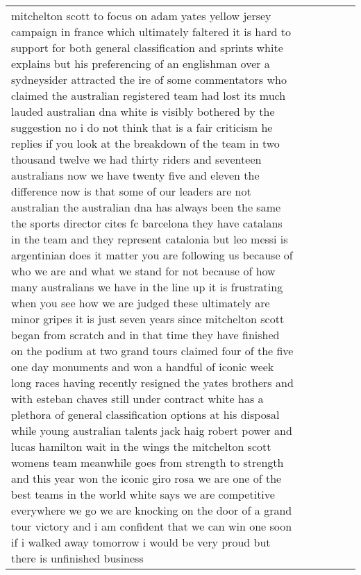 \documentclass[]{article}
\begin{document}
\begin{table}[!h]
\begin{tabular}[t]{llllll}
mitchelton scott to focus on adam yates yellow jersey campaign in france which ultimately faltered it is hard to support for both general classification and sprints white explains but his preferencing of an englishman over a sydneysider attracted the ire of some commentators who claimed the australian registered team had lost its much lauded australian dna white is visibly bothered by the suggestion no i do not think that is a fair criticism he replies if you look at the breakdown of the team in two thousand twelve we had thirty riders and seventeen australians now we have twenty five and eleven the difference now is that some of our leaders are not australian the australian dna has always been the same the sports director cites fc barcelona they have catalans in the team and they represent catalonia but leo messi is argentinian does it matter you are following us because of who we are and what we stand for not because of how many australians we have in the line up it is frustrating when you see how we are judged these ultimately are minor gripes it is just seven years since mitchelton scott began from scratch and in that time they have finished on the podium at two grand tours claimed four of the five one day monuments and won a handful of iconic week long races having recently resigned the yates brothers and with esteban chaves still under contract white has a plethora of general classification options at his disposal while young australian talents jack haig robert power and lucas hamilton wait in the wings the mitchelton scott womens team meanwhile goes from strength to strength and this year won the iconic giro rosa we are one of the best teams in the world white says we are competitive everywhere we go we are knocking on the door of a grand tour victory and i am confident that we can win one soon if i walked away tomorrow i would be very proud but there is unfinished business\\

\end{tabular}
\end{table}
\end{document}
